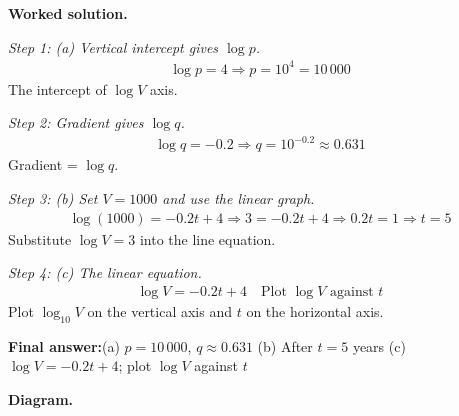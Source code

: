 \documentclass[11pt]{article}
\begin{document}
\textbf{Worked solution.}

\textit{Step 1: (a) Vertical intercept gives \( \log p \).}
\[\begin{gathered}
\log p = 4 \Rightarrow p = 10^4 = 10\,000
\end{gathered}\]
The intercept of \( \log V \) axis.

\textit{Step 2: Gradient gives \( \log q \).}
\[\begin{gathered}
\log q = -0.2 \Rightarrow q = 10^{-0.2} \approx 0.631
\end{gathered}\]
Gradient = \( \log q \).

\textit{Step 3: (b) Set \( V = 1000 \) and use the linear graph.}
\[\begin{gathered}
\log(1000) = -0.2t + 4 \Rightarrow 3 = -0.2t + 4 \Rightarrow 0.2t = 1 \Rightarrow t = 5
\end{gathered}\]
Substitute \( \log V = 3 \) into the line equation.

\textit{Step 4: (c) The linear equation.}
\[\begin{gathered}
\log V = -0.2t + 4 \quad \text{Plot } \log V \text{ against } t
\end{gathered}\]
Plot \( \log_{10} V \) on the vertical axis and \( t \) on the horizontal axis.

\begin{answerbox}
\textbf{Final answer:}\quad (a) \(\displaystyle  p = 10\,000 \), \(\displaystyle  q \approx 0.631 \) \quad  (b) After \(\displaystyle  t = 5 \) years \quad  (c) \(\displaystyle  \log V = -0.2t + 4 \); plot \(\displaystyle  \log V \) against \(\displaystyle  t \)
\end{answerbox}
\textbf{Diagram.}
\end{document}
